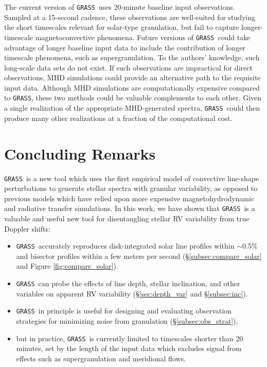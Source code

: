 \documentclass[twocolumn]{aastex63}
\newcommand{\grass}{\texttt{GRASS}}
\newcommand{\revise}[1]{#1}
\begin{document}
The current version of \grass\ uses 20-minute baseline input observations. Sampled at a 15-second cadence, these observations are well-suited for studying the short timescales relevant for solar-type granulation, but fail to capture longer-timescale magnetoconvective phenomena. Future versions of \grass\ could take advantage of longer baseline input data to include the contribution of longer timescale phenomena, such as supergranulation. To the authors' knowledge, such long-scale data sets do not exist. If such observations are impractical for direct observations, MHD simulations could provide an alternative path to the requisite input data. Although MHD simulations are computationally expensive compared to \grass, these two methods could be valuable complements to each other. Given a single realization of the appropriate MHD-generated spectra, \grass\ could then produce many other realizations at a fraction of the computational cost. \par

\section{Concluding Remarks}
\grass\ is a new tool which uses the first empirical model of convective line-shape perturbations to generate stellar spectra with granular variability, as opposed to previous models which have relied upon more expensive magnetohydrodynamic and radiative transfer simulations. In this work, we have shown that \grass\  is a valuable and useful new tool for disentangling stellar RV variability from true Doppler shifts:

\begin{itemize}
    \item \grass\  accurately reproduces disk-integrated solar line profiles within $\sim$0.5\% and bisector profiles within a few meters per second (\S\ref{subsec:compare_solar} and Figure \ref{fig:compare_solar}). 
    \item \grass\ can probe the effects of line depth, stellar inclination, and other variables on apparent RV variability (\S\ref{sec:depth_var} and \S\ref{subsec:inc}).
    \item \grass\ in principle is useful for designing and evaluating observation strategies for minimizing noise from granulation (\S\ref{subsec:obs_strat}),
    \item \revise{but in practice, \grass\ is currently limited to timescales shorter than 20 minutes, set by the length of the input data which excludes signal from effects such as supergranulation and meridional flows.}
\end{itemize}
\end{document}
